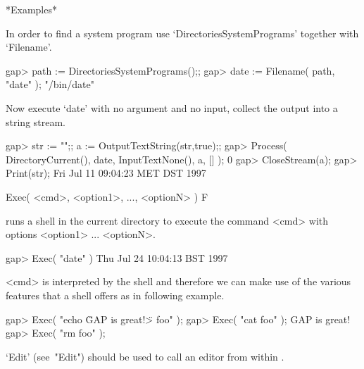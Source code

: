 *Examples*

In   order to  find   a  system program  use  `DirectoriesSystemPrograms'
together with `Filename'.

\begintt
gap> path := DirectoriesSystemPrograms();;
gap> date := Filename( path, "date" );
"/bin/date"
\endtt

Now execute `date' with no argument and no input, collect the output into
a string stream.

\begintt
gap> str := "";; a := OutputTextString(str,true);;
gap> Process( DirectoryCurrent(), date, InputTextNone(), a, [] );
0
gap> CloseStream(a);
gap> Print(str);   
Fri Jul 11 09:04:23 MET DST 1997
\endtt


\>Exec( <cmd>, <option1>, ..., <optionN> ) F

runs a shell in the  current directory to execute  the command <cmd> with
options <option1> ... <optionN>.

\begintt
gap> Exec( "date" )
Thu Jul 24 10:04:13 BST 1997
\endtt

<cmd> is  interpreted by the shell  and therefore we  can make use of the
various features that a shell offers as in following example.

\beginexample
gap> Exec( "echo \"GAP is great!\" > foo" );    
gap> Exec( "cat foo" );
GAP is great!
gap> Exec( "rm foo" );
\endexample

`Edit' (see~"Edit") should be used to call an editor from within {\GAP}.



